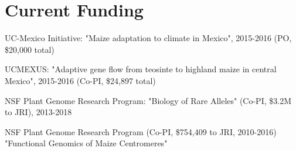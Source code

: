 \documentclass[letterpaper]{article}
\renewenvironment{itemize}{
  \begin{list}{}{
    \setlength{\leftmargin}{1.5em}
  }
}{
  \end{list}
}
\begin{document}
\section*{Current Funding}
\begin{itemize}
\item UC-Mexico Initiative: "Maize adaptation to climate in Mexico", 2015-2016 (PO, \$20,000 total)
\item UCMEXUS: "Adaptive gene flow from teosinte to highland maize in central Mexico", 2015-2016 (Co-PI, \$24,897 total)
\item NSF Plant Genome Research Program: "Biology of Rare Alleles" (Co-PI, \$3.2M to JRI), 2013-2018
\item NSF Plant Genome Research Program (Co-PI, \$754,409 to JRI, 2010-2016) "Functional Genomics of Maize Centromeres"
\end{itemize}

\end{document}
